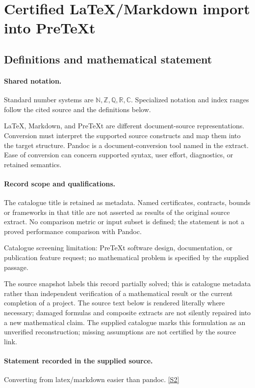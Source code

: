 \documentclass[11pt]{article}
\newcommand{\sref}[2]{\hyperlink{source:#1:#2}{[S#2]}}
\begin{document}
\section{Certified LaTeX/Markdown import into PreTeXt}\label{statement}

\subsection{Definitions and mathematical statement}

\paragraph{Shared notation.}Standard number systems are $\mathbb N,\mathbb Z,\mathbb Q,\mathbb R,\mathbb C$. Specialized notation and index ranges follow the cited source and the definitions below.


LaTeX, Markdown, and PreTeXt are different document-source representations. Conversion must interpret the supported source constructs and map them into the target structure. Pandoc is a document-conversion tool named in the extract. Ease of conversion can concern supported syntax, user effort, diagnostics, or retained semantics.
\paragraph{Record scope and qualifications.}
The catalogue title is retained as metadata. Named certificates, contracts, bounds or frameworks in that title are not asserted as results of the original source extract.
No comparison metric or input subset is defined; the statement is not a proved performance comparison with Pandoc.

Catalogue screening limitation: PreTeXt software design, documentation, or publication feature request; no mathematical problem is specified by the supplied passage.

The source snapshot labels this record partially solved; this is catalogue metadata rather than independent verification of a mathematical result or the current completion of a project.
The source text below is rendered literally where necessary; damaged formulas and composite extracts are not silently repaired into a new mathematical claim.
The supplied catalogue marks this formulation as an unverified reconstruction; missing assumptions are not certified by the source link.
\paragraph{Statement recorded in the supplied source.}
Converting from latex/markdown easier than pandoc. \sref{statement}{2}
\end{document}
